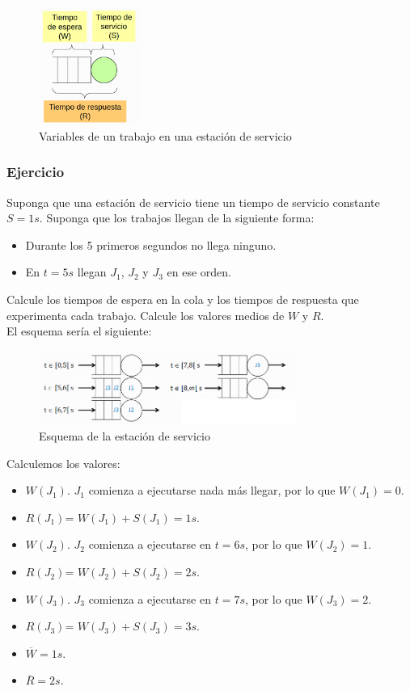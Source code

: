 \documentclass[12pt,spanish]{article}
\begin{document}
\begin{figure}[H]
	\centering
	\includegraphics[width=0.3\textwidth]{variablesestserv.png}
	\caption{Variables de un trabajo en una estación de servicio}
\end{figure}

\subsubsection{Ejercicio}

Suponga que una estación de servicio tiene un tiempo de servicio constante $S=1s$. Suponga que los trabajos llegan de la siguiente forma:
\begin{itemize}
	\item Durante los 5 primeros segundos no llega ninguno.
	\item En $t=5s$ llegan $J_1$, $J_2$ y $J_3$ en ese orden.
\end{itemize}
Calcule los tiempos de espera en la cola y los tiempos de respuesta que experimenta cada trabajo. Calcule los valores medios de $W$ y $R$.\\

El esquema sería el siguiente:

\begin{figure}[H]
	\centering
	\includegraphics[width=0.75\textwidth]{t5ej.png}
	\caption{Esquema de la estación de servicio}
\end{figure}

Calculemos los valores:
\begin{itemize}
	\item $W(J_1)$. $J_1$ comienza a ejecutarse nada más llegar, por lo que $W(J_1)=0$.
	\item $R(J_1)$= $W(J_1) + S(J_1)=1s$.
	\item $W(J_2)$. $J_2$ comienza a ejecutarse en $t=6s$, por lo que $W(J_2)=1$.
	\item $R(J_2)$= $W(J_2) + S(J_2)=2s$.
	\item $W(J_3)$. $J_3$ comienza a ejecutarse en $t=7s$, por lo que $W(J_3)=2$.
	\item $R(J_3)$= $W(J_3) + S(J_3)=3s$.
	\item $\overline{W}=1s$.
	\item $\overline{R}=2s$.
\end{itemize}
\end{document}
